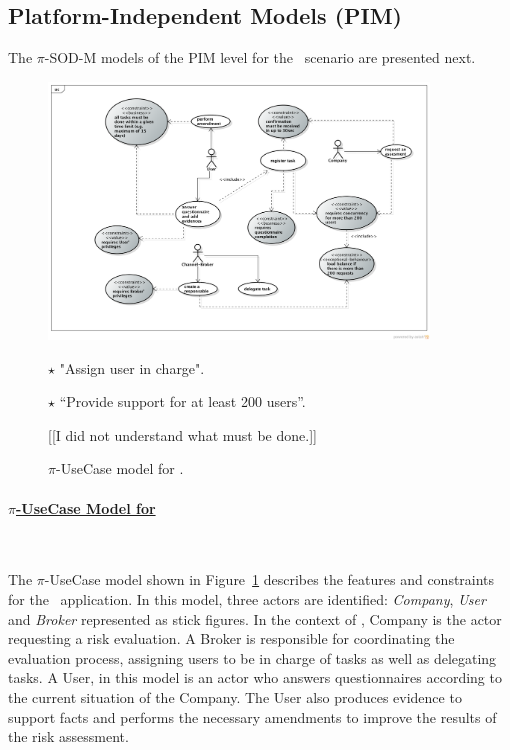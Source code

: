 \subsection{Platform-Independent Models (PIM)}

The $\pi$-SOD-M models of the PIM level  for the \FlyingPig\ scenario are presented next.

\begin{figure}[t]
\centering
\includegraphics[width=0.9\textwidth]{figs/UseCaseGeneral.png}

{\color{red} \raggedright
$\star$  "Assign user in charge".

$\star$ ``Provide support for at least 200 users''.
} {\color{blue} [[I did not understand what must be done.]]}
\caption{$\pi$-UseCase model for \FlyingPig.\label{fig:piUseCaseModel}}
\end{figure}


\paragraph{\underline{$\pi$-UseCase Model for \FlyingPig}}~

The $\pi$-UseCase model shown in Figure~\ref{fig:piUseCaseModel} describes the features and constraints for the \FlyingPig\ application. 
In this model, three actors are identified: \textit{Company}, \textit{User} and \textit {Broker} represented as stick figures.
In the context of \FlyingPig, Company is the actor requesting a risk evaluation.
A Broker is  responsible for coordinating  the evaluation process, assigning users to be in charge of tasks as well as delegating tasks. 
A User, in this model is an actor who answers questionnaires according to the current situation  of the Company.
The User also produces evidence to support facts and performs the necessary amendments to improve the results of the risk assessment.

